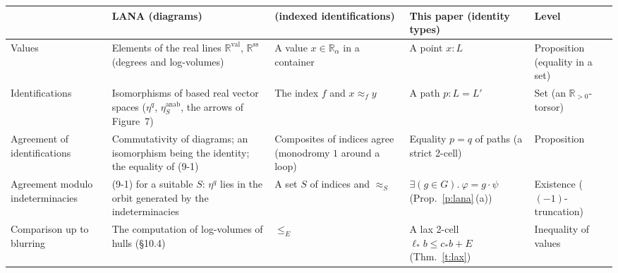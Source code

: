 \documentclass[11pt,a4paper]{article}
\newcommand{\R}{\mathbb{R}}
\newcommand{\Rp}{\mathbb{R}_{>0}}
\newcommand{\anab}{\mathrm{anab}}
\theoremstyle{plain}
\theoremstyle{definition}
\theoremstyle{remark}
\begin{document}
{\footnotesize
\begin{longtable}{@{}>{\raggedright\arraybackslash}p{2.3cm}>{\raggedright\arraybackslash}p{4.2cm}>{\raggedright\arraybackslash}p{2.6cm}>{\raggedright\arraybackslash}p{2.9cm}>{\raggedright\arraybackslash}p{2.0cm}@{}}
\toprule
& LANA (diagrams) & \cite{UE} (indexed identifications) & This paper (identity types) & Level\\
\midrule
\endhead
Values & Elements of the real lines $\R^{\mathrm{val}}$, $\R^{\mathrm{ss}}$ (degrees and log-volumes) & A value
$x\in\R_\alpha$ in a container & A point $x:L$ & Proposition (equality in a set)\\
Identifications & Isomorphisms of based real vector spaces ($\eta^q$, $\eta^{\anab}_S$, the arrows of Figure~7) & The
index $f$ and $x\approx_f y$ & A path $p:L=L'$ & Set (an $\Rp$-torsor)\\
Agreement of identifications & Commutativity of diagrams; an isomorphism being the identity; the equality of (9-1) &
Composites of indices agree (monodromy $1$ around a loop) & Equality $p=q$ of paths (a strict 2-cell) &
Proposition\\
Agreement modulo indeterminacies & (9-1) for a suitable $S$: $\eta^q$ lies in the orbit generated by the
indeterminacies & A set $S$ of indices and $\approx_S$ & $\exists(g\in G).\ \varphi=g\cdot\psi$
(Prop.~\ref{p:lana}\,(a)) & Existence ($(-1)$-truncation)\\
Comparison up to blurring & The computation of log-volumes of hulls (\S10.4) & $\le_E$ & A lax 2-cell
$\ell_*b\le c_*b+E$ (Thm.~\ref{t:lax}) & Inequality of values\\
\bottomrule
\end{longtable}
}
\end{document}
